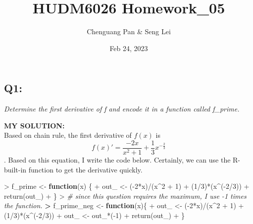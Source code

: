 \documentclass[
]{article}
\title{HUDM6026 Homework\_05}
\author{Chenguang Pan \& Seng Lei}
\date{Feb 24, 2023}
\newenvironment{Shaded}{\begin{snugshade}}{\end{snugshade}}
\newcommand{\CommentTok}[1]{\textcolor[rgb]{0.56,0.35,0.01}{\textit{#1}}}
\newcommand{\ControlFlowTok}[1]{\textcolor[rgb]{0.13,0.29,0.53}{\textbf{#1}}}
\newcommand{\DecValTok}[1]{\textcolor[rgb]{0.00,0.00,0.81}{#1}}
\newcommand{\ErrorTok}[1]{\textcolor[rgb]{0.64,0.00,0.00}{\textbf{#1}}}
\newcommand{\FunctionTok}[1]{\textcolor[rgb]{0.00,0.00,0.00}{#1}}
\newcommand{\NormalTok}[1]{#1}
\newcommand{\OtherTok}[1]{\textcolor[rgb]{0.56,0.35,0.01}{#1}}
\newcommand{\SpecialCharTok}[1]{\textcolor[rgb]{0.00,0.00,0.00}{#1}}
\begin{document}
\maketitle

\hypertarget{q1}{%
\subsection{Q1:}\label{q1}}

\emph{Determine the first derivative of f and encode it in a function
called f\_prime.}

\textbf{MY SOLUTION:}\\
Based on chain rule, the first derivative of \(f(x)\) is
\[f(x)' = \frac{-2x}{x^2+1}+\frac{1}{3}x^{-\frac{2}{3}}\]. Based on this
equation, I write the code below. Certainly, we can use the R-built-in
function to get the derivative quickly.

\begin{Shaded}
\begin{Highlighting}[]
\SpecialCharTok{\textgreater{}}\NormalTok{ f\_prime }\OtherTok{\textless{}{-}} \ControlFlowTok{function}\NormalTok{(x) \{}
\SpecialCharTok{+}\NormalTok{   out\_ }\OtherTok{\textless{}{-}}\NormalTok{ (}\SpecialCharTok{{-}}\DecValTok{2}\SpecialCharTok{*}\NormalTok{x)}\SpecialCharTok{/}\NormalTok{(x}\SpecialCharTok{\^{}}\DecValTok{2} \SpecialCharTok{+} \DecValTok{1}\NormalTok{) }\SpecialCharTok{+}\NormalTok{ (}\DecValTok{1}\SpecialCharTok{/}\DecValTok{3}\NormalTok{)}\SpecialCharTok{*}\NormalTok{(x}\SpecialCharTok{\^{}}\NormalTok{(}\SpecialCharTok{{-}}\DecValTok{2}\SpecialCharTok{/}\DecValTok{3}\NormalTok{))}
\SpecialCharTok{+}   \FunctionTok{return}\NormalTok{(out\_)}
\SpecialCharTok{+}\NormalTok{ \}}
\SpecialCharTok{\textgreater{}} \CommentTok{\# since this question requires the maximum, I use {-}1 times the function.}
\ErrorTok{\textgreater{}}\NormalTok{ f\_prime\_neg }\OtherTok{\textless{}{-}} \ControlFlowTok{function}\NormalTok{(x)\{}
\SpecialCharTok{+}\NormalTok{   out\_ }\OtherTok{\textless{}{-}}\NormalTok{ (}\SpecialCharTok{{-}}\DecValTok{2}\SpecialCharTok{*}\NormalTok{x)}\SpecialCharTok{/}\NormalTok{(x}\SpecialCharTok{\^{}}\DecValTok{2} \SpecialCharTok{+} \DecValTok{1}\NormalTok{) }\SpecialCharTok{+}\NormalTok{ (}\DecValTok{1}\SpecialCharTok{/}\DecValTok{3}\NormalTok{)}\SpecialCharTok{*}\NormalTok{(x}\SpecialCharTok{\^{}}\NormalTok{(}\SpecialCharTok{{-}}\DecValTok{2}\SpecialCharTok{/}\DecValTok{3}\NormalTok{))}
\SpecialCharTok{+}\NormalTok{   out\_ }\OtherTok{\textless{}{-}}\NormalTok{ out\_}\SpecialCharTok{*}\NormalTok{(}\SpecialCharTok{{-}}\DecValTok{1}\NormalTok{)}
\SpecialCharTok{+}   \FunctionTok{return}\NormalTok{(out\_)}
\SpecialCharTok{+}\NormalTok{ \}}
\end{Highlighting}
\end{Shaded}
\end{document}
